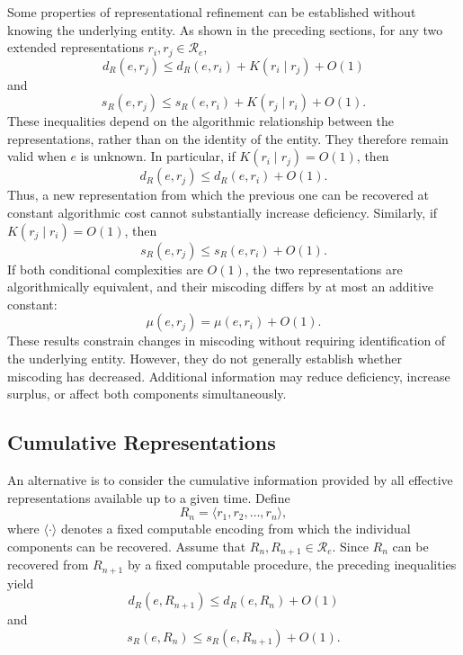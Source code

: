 Some properties of representational refinement can be established without knowing the underlying entity. As shown in the preceding sections, for any two extended representations $r_i,r_j\in\mathcal R_e$,
\[
d_R(e,r_j) \le d_R(e,r_i) + K(r_i\mid r_j) + O(1)
\]
and
\[
s_R(e,r_j) \le s_R(e,r_i) + K(r_j\mid r_i) + O(1).
\]
These inequalities depend on the algorithmic relationship between the representations, rather than on the identity of the entity. They therefore remain valid when $e$ is unknown. In particular, if $K(r_i\mid r_j)=O(1)$, then
\[
d_R(e,r_j)\le d_R(e,r_i)+O(1).
\]
Thus, a new representation from which the previous one can be recovered at constant algorithmic cost cannot substantially increase deficiency. Similarly, if $K(r_j\mid r_i)=O(1)$, then
\[
s_R(e,r_j)\le s_R(e,r_i)+O(1).
\]
If both conditional complexities are $O(1)$, the two representations are algorithmically equivalent, and their miscoding differs by at most an additive constant:
\[
\mu(e,r_j)=\mu(e,r_i)+O(1).
\]
These results constrain changes in miscoding without requiring identification of the underlying entity. However, they do not generally establish whether miscoding has decreased. Additional information may reduce deficiency, increase surplus, or affect both components simultaneously.


\subsection*{Cumulative Representations}

An alternative is to consider the cumulative information provided by all effective representations available
up to a given time. Define
\[
R_n=\langle r_1,r_2,\ldots,r_n\rangle,
\]
where $\langle\cdot\rangle$ denotes a fixed computable encoding from which the individual components can be recovered. Assume that $R_n,R_{n+1}\in\mathcal R_e$. Since $R_n$ can be recovered from $R_{n+1}$ by a fixed computable procedure, the preceding inequalities yield
\[
d_R(e,R_{n+1}) \le d_R(e,R_n) + O(1)
\]
and
\[
s_R(e,R_n) \le s_R(e,R_{n+1}) + O(1).
\]

